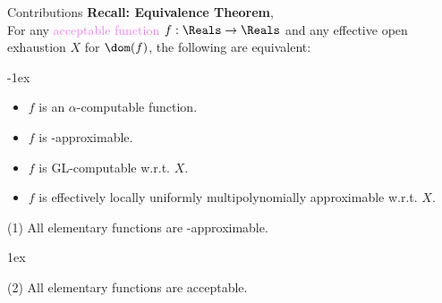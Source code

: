 \begin{frame}{Contributions}
    \vspace{-1em}
    {\color{gray}
    \textcolor{OliveGreen}{\textbf{Recall: Equivalence Theorem}, \citep{ModelOfCompForPartFunc_MingQuanFuAndJeffZucker}}\\
    For any \textcolor{violet}{acceptable function} $f:\Reals\to\Reals$ and any {effective open exhaustion} $X$ for $\dom(f)$, the following are equivalent:}

    \kern-1ex
        \begin{itemize}
            \setlength\itemsep{-3pt}\color{gray}
            \item $f$ is an $\alpha$-computable function.
            \item $f$ is \textcolor{BrickRed}{\WhileCC-approximable}.
            \item $f$ is GL-computable w.r.t. $X$.
            \item $f$ is effectively locally uniformly multipolynomially approximable w.r.t. $X$.
        \end{itemize}
        
    \pause 
    \begin{ntheorem}(1)
        All elementary functions are \WhileCC-approximable.
    \end{ntheorem}
    \kern1ex
    \pause
    \begin{ntheorem}(2)
        All elementary functions are acceptable.
    \end{ntheorem}
\end{frame}
